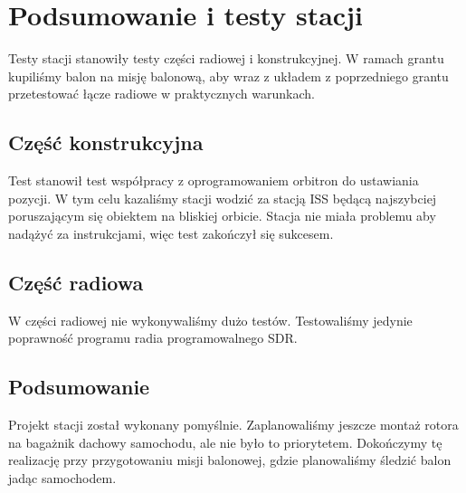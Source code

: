 \section{Podsumowanie i testy stacji}

Testy stacji stanowiły testy części radiowej i konstrukcyjnej. W ramach grantu kupiliśmy balon na misję balonową, aby wraz z układem z poprzedniego grantu przetestować łącze radiowe w praktycznych warunkach.

\subsection{Część konstrukcyjna}

Test stanowił test współpracy z oprogramowaniem orbitron do ustawiania pozycji. W tym celu kazaliśmy stacji wodzić za stacją ISS będącą najszybciej poruszającym się obiektem na bliskiej orbicie. Stacja nie miała problemu aby nadążyć za instrukcjami, więc test zakończył się sukcesem.

\subsection{Część radiowa}

W części radiowej nie wykonywaliśmy dużo testów. Testowaliśmy jedynie poprawność programu radia programowalnego SDR.

\subsection{Podsumowanie}

Projekt stacji został wykonany pomyślnie. Zaplanowaliśmy jeszcze montaż rotora na bagażnik dachowy samochodu, ale nie było to priorytetem. Dokończymy tę realizację przy przygotowaniu misji balonowej, gdzie planowaliśmy śledzić balon jadąc samochodem.
